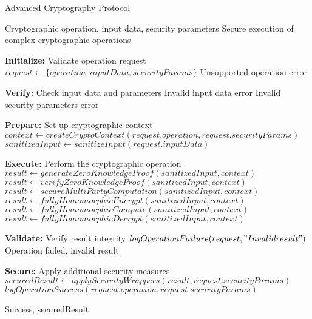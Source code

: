 
\begin{algorithm}
\caption{Advanced Cryptography Protocol}
\label{alg:advanced-crypto}
\begin{algorithmic}[1]
\Require Cryptographic operation, input data, security parameters
\Ensure Secure execution of complex cryptographic operations

\State \textbf{Initialize:} Validate operation request
\State $request \gets \{operation, inputData, securityParams\}$
    \State \Return Unsupported operation error
\EndIf

\State \textbf{Verify:} Check input data and parameters
    \State \Return Invalid input data error
\EndIf
{}
    \State \Return Invalid security parameters error
\EndIf

\State \textbf{Prepare:} Set up cryptographic context
\State $context \gets createCryptoContext(request.operation, request.securityParams)$
\State $sanitizedInput \gets sanitizeInput(request.inputData)$

\State \textbf{Execute:} Perform the cryptographic operation
    \State $result \gets generateZeroKnowledgeProof(sanitizedInput, context)$
    \State $result \gets verifyZeroKnowledgeProof(sanitizedInput, context)$
    \State $result \gets secureMultiPartyComputation(sanitizedInput, context)$
    \State $result \gets fullyHomomorphicEncrypt(sanitizedInput, context)$
    \State $result \gets fullyHomomorphicCompute(sanitizedInput, context)$
    \State $result \gets fullyHomomorphicDecrypt(sanitizedInput, context)$
\EndIf

\State \textbf{Validate:} Verify result integrity
    \State $logOperationFailure(request, "Invalid result")$
    \State \Return Operation failed, invalid result
\EndIf

\State \textbf{Secure:} Apply additional security measures
\State $securedResult \gets applySecurityWrappers(result, request.securityParams)$
\State $logOperationSuccess(request.operation, request.securityParams)$

\State \Return Success, securedResult
\end{algorithmic}
\end{algorithm} 